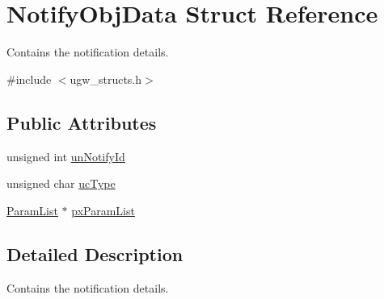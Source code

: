 \hypertarget{structNotifyObjData}{\section{Notify\-Obj\-Data Struct Reference}
\label{structNotifyObjData}
}


Contains the notification details.  




{\ttfamily \#include $<$ugw\-\_\-structs.\-h$>$}

\subsection*{Public Attributes}
\begin{DoxyCompactItemize}
\item 
unsigned int \hyperlink{structNotifyObjData_ae893026ee94e65614ead5178f71ac485}{un\-Notify\-Id}
\item 
unsigned char \hyperlink{structNotifyObjData_a1d1a9ff0a7887106467b7ea9002c9940}{uc\-Type}
\item 
\hyperlink{structParamList}{Param\-List} $\ast$ \hyperlink{structNotifyObjData_ae0b88ded42248e172ca4dfde653478aa}{px\-Param\-List}
\end{DoxyCompactItemize}


\subsection{Detailed Description}
Contains the notification details. 

